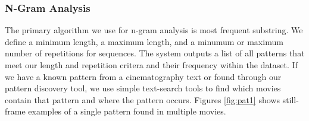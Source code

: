 \subsubsection*{N-Gram Analysis}

The primary algorithm we use for n-gram analysis is most frequent substring. We define a minimum length, a maximum length, and a minumum or maximum number of repetitions for sequences. The system outputs a list of all patterns that meet our length and repetition critera and their frequency within the dataset. If we have a known pattern from a cinematography text or found through our pattern discovery tool, we use simple text-search tools to find which movies contain that pattern and where the pattern occurs. Figures \ref{fig:pat1} shows still-frame examples of a single pattern found in multiple movies.




